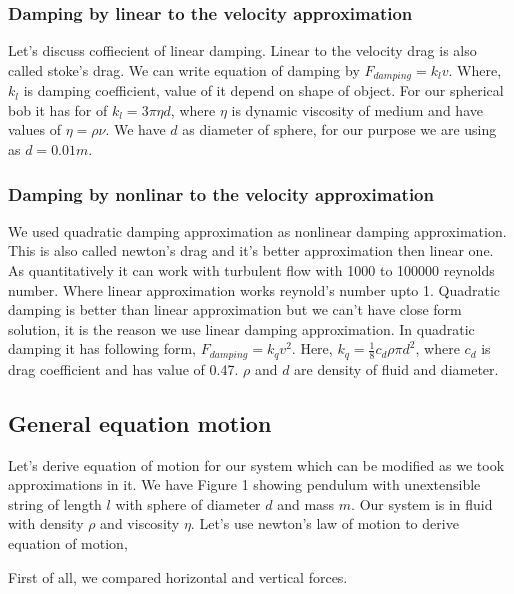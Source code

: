 \documentclass[11pt,a4paper]{article}
\begin{document}
\subsubsection{Damping by linear to the velocity approximation}
\label{sec:org6b15d0a}

Let's discuss coffiecient of linear damping. Linear to the velocity drag is also called stoke's drag. We can write equation of damping by \(F_{damping} = k_{l}v\). Where, \(k_{l}\) is damping coefficient, value of it depend on shape of object. For our spherical bob it has for of \(k_{l} = 3\pi\eta d\), where \(\eta\) is dynamic viscosity of medium and have values of \(\eta = \rho \nu\). We have \(d\) as diameter of sphere, for our purpose we are using as \(d=0.01m\). 

\subsubsection{Damping by nonlinar to the velocity approximation}
\label{sec:org68c5fbd}

We used quadratic damping approximation as nonlinear damping approximation. This is also called newton's drag and it's better approximation then linear one. As quantitatively it can work with turbulent flow with 1000 to 100000 reynolds number. Where linear approximation works reynold's number upto 1. Quadratic damping is better than linear approximation but we can't have close form solution, it is the reason we use linear damping approximation. In quadratic damping it has following form, \(F_{damping} = k_{q} v^{2}\). Here, \(k_{q} = \frac{1}{8}c_{d}\rho \pi d^{2}\), where \(c_{d}\) is drag coefficient and has value of 0.47. \(\rho\) and \(d\) are density of fluid and diameter.\cite{lubarda2021analysis}\cite{goossens2019review}


\subsection{General equation motion}
\label{sec:org97af04b}

Let's derive equation of motion for our system which can be modified as we took approximations in it. We have Figure 1 showing pendulum with unextensible string of length \(l\) with sphere of diameter \(d\) and mass \(m\). Our system is in fluid with density \(\rho\) and viscosity \(\eta\). Let's use newton's law of motion to derive equation of motion,

First of all, we compared horizontal and vertical forces.
\end{document}
